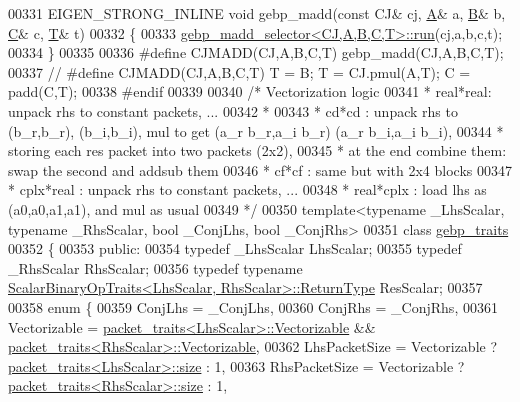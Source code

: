 \begin{DoxyCode}
00331   EIGEN\_STRONG\_INLINE \textcolor{keywordtype}{void} gebp\_madd(\textcolor{keyword}{const} CJ& cj, \hyperlink{group___core___module_class_eigen_1_1_matrix}{A}& a, \hyperlink{group___core___module_class_eigen_1_1_matrix}{B}& b, \hyperlink{group___core___module}{C}& c, \hyperlink{group___sparse_core___module}{T}& t)
00332   \{
00333     \hyperlink{struct_eigen_1_1internal_1_1gebp__madd__selector}{gebp\_madd\_selector<CJ,A,B,C,T>::run}(cj,a,b,c,t);
00334   \}
00335 
00336 \textcolor{preprocessor}{  #define CJMADD(CJ,A,B,C,T)  gebp\_madd(CJ,A,B,C,T);}
00337 \textcolor{comment}{//   #define CJMADD(CJ,A,B,C,T)  T = B; T = CJ.pmul(A,T); C = padd(C,T);}
00338 \textcolor{preprocessor}{#endif}
00339 
00340 \textcolor{comment}{/* Vectorization logic}
00341 \textcolor{comment}{ *  real*real: unpack rhs to constant packets, ...}
00342 \textcolor{comment}{ * }
00343 \textcolor{comment}{ *  cd*cd : unpack rhs to (b\_r,b\_r), (b\_i,b\_i), mul to get (a\_r b\_r,a\_i b\_r) (a\_r b\_i,a\_i b\_i),}
00344 \textcolor{comment}{ *          storing each res packet into two packets (2x2),}
00345 \textcolor{comment}{ *          at the end combine them: swap the second and addsub them }
00346 \textcolor{comment}{ *  cf*cf : same but with 2x4 blocks}
00347 \textcolor{comment}{ *  cplx*real : unpack rhs to constant packets, ...}
00348 \textcolor{comment}{ *  real*cplx : load lhs as (a0,a0,a1,a1), and mul as usual}
00349 \textcolor{comment}{ */}
00350 \textcolor{keyword}{template}<\textcolor{keyword}{typename} \_LhsScalar, \textcolor{keyword}{typename} \_RhsScalar, \textcolor{keywordtype}{bool} \_ConjLhs, \textcolor{keywordtype}{bool} \_ConjRhs>
00351 \textcolor{keyword}{class }\hyperlink{class_eigen_1_1internal_1_1gebp__traits}{gebp\_traits}
00352 \{
00353 \textcolor{keyword}{public}:
00354   \textcolor{keyword}{typedef} \_LhsScalar LhsScalar;
00355   \textcolor{keyword}{typedef} \_RhsScalar RhsScalar;
00356   \textcolor{keyword}{typedef} \textcolor{keyword}{typename} \hyperlink{group___core___module_struct_eigen_1_1_scalar_binary_op_traits}{ScalarBinaryOpTraits<LhsScalar, RhsScalar>::ReturnType}
       ResScalar;
00357 
00358   \textcolor{keyword}{enum} \{
00359     ConjLhs = \_ConjLhs,
00360     ConjRhs = \_ConjRhs,
00361     Vectorizable = \hyperlink{struct_eigen_1_1internal_1_1packet__traits}{packet\_traits<LhsScalar>::Vectorizable} && 
      \hyperlink{struct_eigen_1_1internal_1_1packet__traits}{packet\_traits<RhsScalar>::Vectorizable},
00362     LhsPacketSize = Vectorizable ? \hyperlink{struct_eigen_1_1internal_1_1packet__traits}{packet\_traits<LhsScalar>::size} : 1,
00363     RhsPacketSize = Vectorizable ? \hyperlink{struct_eigen_1_1internal_1_1packet__traits}{packet\_traits<RhsScalar>::size} : 1,

\end{DoxyCode}
